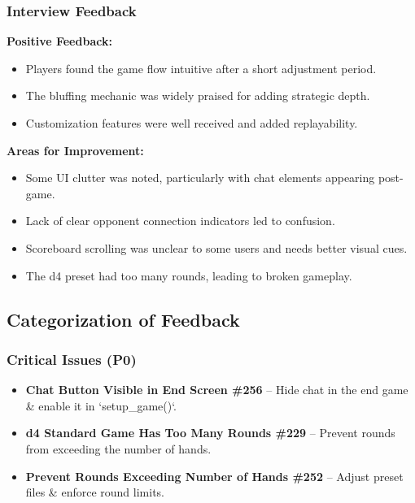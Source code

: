 \documentclass[12pt, titlepage]{article}
\begin{document}
\subsubsection{Interview Feedback}

\textbf{Positive Feedback:}
\begin{itemize}
    \item Players found the game flow intuitive after a short adjustment period.
    \item The bluffing mechanic was widely praised for adding strategic depth.
    \item Customization features were well received and added replayability.
\end{itemize}

\textbf{Areas for Improvement:}
\begin{itemize}
    \item Some UI clutter was noted, particularly with chat elements appearing post-game.
    \item Lack of clear opponent connection indicators led to confusion.
    \item Scoreboard scrolling was unclear to some users and needs better visual cues.
    \item The d4 preset had too many rounds, leading to broken gameplay.
\end{itemize}


\subsection{Categorization of Feedback}

\subsubsection{Critical Issues (P0)}
\begin{itemize}
    \item \textbf{Chat Button Visible in End Screen \#256} – Hide chat in the end game \& enable it in `setup\_game()`.
    \item \textbf{d4 Standard Game Has Too Many Rounds \#229} – Prevent rounds from exceeding the number of hands.
    \item \textbf{Prevent Rounds Exceeding Number of Hands \#252} – Adjust preset files \& enforce round limits.
\end{itemize}
\end{document}
